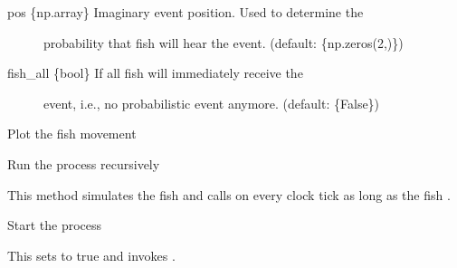\documentclass[letterpaper,10pt,english]{sphinxmanual}
\begin{document}
\begin{fulllineitems}
\begin{fulllineitems}
\begin{description}
\begin{description}
\item[{pos \{np.array\} \textendash{} Imaginary event position. Used to determine the}] \leavevmode
probability that fish will hear the
event. (default: \{np.zeros(2,)\})

\item[{fish\_all \{bool\} \textendash{} If  all fish will immediately receive the}] \leavevmode
event, i.e., no probabilistic event anymore. (default: \{False\})

\end{description}

\end{description}

\end{fulllineitems}


\begin{fulllineitems}
\label{\detokenize{index:observer.Observer.plot}}
Plot the fish movement

\end{fulllineitems}


\begin{fulllineitems}
\label{\detokenize{index:observer.Observer.run}}
Run the process recursively

This method simulates the fish and calls  on every clock tick as
long as the fish .

\end{fulllineitems}


\begin{fulllineitems}
\label{\detokenize{index:observer.Observer.start}}
Start the process

This sets  to true and invokes .


\end{fulllineitems}
\end{fulllineitems}
\end{document}
